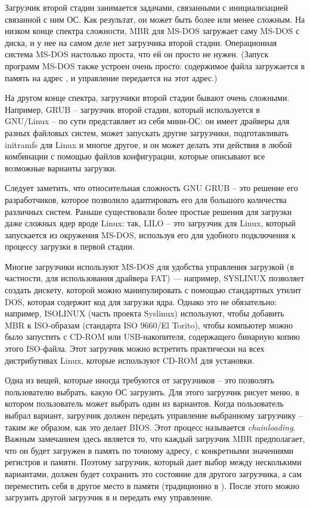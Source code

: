 \documentclass[a4page]{article}
\begin{document}
Загрузчик второй стадии занимается задачами, связанными с инициализацией связанной с ним ОС.
Как результат, он может быть более или менее сложным.
На низком конце спектра сложности, MBR для MS-DOS загружает саму MS-DOS с диска, и 
у нее на самом деле нет загрузчика второй стадии.
Операционная система MS-DOS настолько проста, что ей он просто не нужен.
(Запуск программ MS-DOS также устроен очень просто: содержимое файла загружается в память
на адрес , и управление передается на этот адрес.)

На другом конце спектра, загрузчики второй стадии бывают очень сложными.
Например, GRUB -- загрузчик второй стадии, который используется в GNU/Linux -- по сути представляет из себя
мини-ОС: он имеет драйверы для разных файловых систем, может запускать другие загрузчики,
подготавливать initramfs для Linux и многое другое, и он может делать эти действия в любой комбинации
с помощью файлов конфигурации, которые описывают все возможные варианты загрузки.


Следует заметить, что относительная сложность GNU GRUB -- это решение его разработчиков, которое позволило
адаптировать его для большого количества различных систем.
Раньше существовали более простые решения для загрузки даже сложных ядер вроде Linux:
так, LILO -- это загрузчик для Linux, который запускается из окружения MS-DOS,
используя его для удобного подключения к процессу загрузки в первой стадии.

Многие загрузчики используют MS-DOS для удобства управления загрузкой (в частности, для использования драйвера FAT) ---
например, SYSLINUX позволяет создать дискету, которой можно манипулировать с помощью стандартных утилит DOS,
которая содержит код для загрузки ядра.
Однако это не обязательно: например, ISOLINUX (часть проекта Syslinux)
используют, чтобы добавить MBR к ISO-образам (стандарта ISO 9660/El Torito),
чтобы компьютер можно было запустить с CD-ROM или USB-накопителя, содержащего бинарную копию этого ISO-файла.
Этот загрузчик можно встретить практически на всех дистрибутивах Linux, которые используют CD-ROM для установки.


Одна из вещей, которые иногда требуются от загрузчиков -- это позволять пользователю выбрать, какую ОС загрузить.
Для этого загрузчик рисует меню, в котором пользователь может выбрать один из вариантов.
Когда пользователь выбрал вариант, загрузчик должен передать управление выбранному загрузчику --
таким же образом, как это делает BIOS.
Этот процесс называется \emph{chainloading}.
Важным замечанием здесь является то, что каждый загрузчик MBR предполагает,
что он будет загружен в память по точному адресу,
с конкретными значениями регистров и памяти.
Поэтому загрузчик, который дает выбор между несколькими вариантами, должен будет сохранить это состояние для другого загрузчика,
а сам переместить себя в другое место в памяти (традиционно в ).
После этого можно загрузить другой загрузчик в  и передать ему управление.
\end{document}
